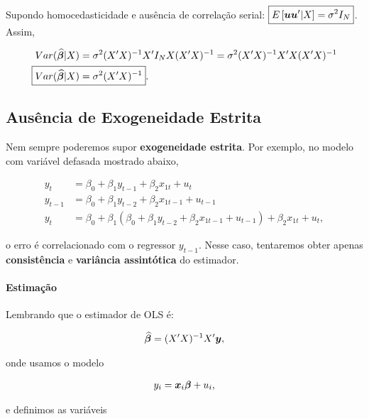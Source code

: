 \documentclass[11pt,oneside,a4paper]{article}
\numberwithin{equation}{section}
\begin{document}
Supondo homocedasticidade e ausência de correlação serial: 
$\boxed{ E \left[ \boldsymbol{u} \boldsymbol{u}'| X \right] = \sigma^2 I_{N} }$.
Assim, 

\begin{align*} 
Var ( \widehat{\mbs{\beta}} | X) 
&= \sigma^2 (X'X)^{-1}X' I_{N} X (X'X)^{-1}
= \sigma^2 (X'X)^{-1}X'X (X'X)^{-1}
\\
\Aboxed{ Var ( \widehat{\mbs{\beta}} | X) &= \sigma^2 (X'X)^{-1} }.
\end{align*}

\subsection*{Ausência de Exogeneidade Estrita}
Nem sempre poderemos supor \textbf{exogeneidade estrita}.
Por exemplo, no modelo com variável defasada mostrado abaixo,

\begin{align*}
y_{t} &= \beta_{0} + \beta_{1} y_{t-1} + \beta_{2} x_{1t} + u_{t}
\\
y_{t-1} &= \beta_{0} + \beta_{1} y_{t-2} + \beta_{2} x_{1t-1} + u_{t-1}
\\
y_{t} &= \beta_{0} +
\beta_{1} \left(  
\beta_{0} + \beta_{1} y_{t-2} + \beta_{2} x_{1t-1} + u_{t-1}
\right)
+
\beta_{2} x_{1t} + u_{t},
\end{align*}

\noindent
o erro é correlacionado com o regressor $y_{t-1}$.
Nesse caso, tentaremos obter apenas \textbf{consistência} e \textbf{variância assintótica} do estimador.

\paragraph{Estimação}

Lembrando que o estimador de OLS é:

\begin{align*}
\widehat{\boldsymbol{\beta}} = (X'X)^{-1}X'\boldsymbol{y},
\end{align*}

\noindent
onde usamos o modelo

\vspace{-1 em}
\begin{align*}
	y_{i} = \boldsymbol{x}_{i} \boldsymbol{\beta} + u_{i},
\end{align*}

\noindent
e definimos as variáveis
\end{document}
